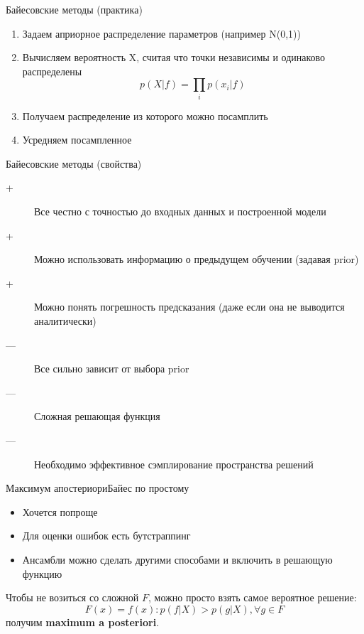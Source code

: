 \documentclass[14pt, fleqn, xcolor={dvipsnames, table}]{beamer}
\begin{document}
\begin{frame}{Байесовские методы (практика)}
\begin{enumerate}
  \item Задаем априорное распределение параметров (например N(0,1))
  \item Вычисляем вероятность X, считая что точки независимы и одинаково распределены
  $$
  p(X|f) = \prod_i p(x_i|f)
  $$
  \item Получаем распределение из которого можно посамплить
  \item Усредняем посампленное
\end{enumerate}
\end{frame}

\begin{frame}{Байесовские методы (свойства)}
\begin{description}
  \item[\color{green}+] Все честно с точностью до входных данных и построенной модели
  \item[\color{green}+] Можно использовать информацию о предыдущем обучении (задавая prior)
  \item[\color{green}+] Можно понять погрешность предсказания (даже если она не выводится аналитически)
\end{description}
\begin{description}
  \item[\color{red}---] Все сильно зависит от выбора prior
  \item[\color{red}---] Сложная решающая функция
  \item[\color{red}---] Необходимо эффективное сэмплирование пространства решений
\end{description}
\end{frame}

\begin{frame}{Максимум апостериори}{Байес по простому}
\begin{itemize}
  \item Хочется попроще
  \item Для оценки ошибок есть бутстраппинг
  \item Ансамбли можно сделать другими способами и включить в решающую функцию
\end{itemize}

Чтобы не возиться со сложной $F$, можно просто взять самое вероятное решение:
$$
F(x) = f(x) : p(f|X) > p(g|X), \forall g \in F
$$
получим \textbf{maximum a posteriori}.
\end{frame}
\end{document}
